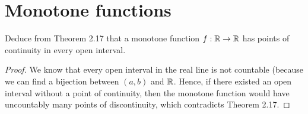\section{Monotone functions}


\begin{exercise}{32}
Deduce from Theorem 2.17 that a monotone function $f:\mathbb{R}\to\mathbb{R}$ has points of continuity in every open interval.
\end{exercise}
\begin{proof}
We know that every open interval in the real line is not countable (because we can find a bijection between $(a,b)$ and $\mathbb{R}$. Hence, if there existed an open interval without a point of continuity, then the monotone function would have uncountably many points of discontinuity, which contradicts Theorem 2.17.
\end{proof} 

